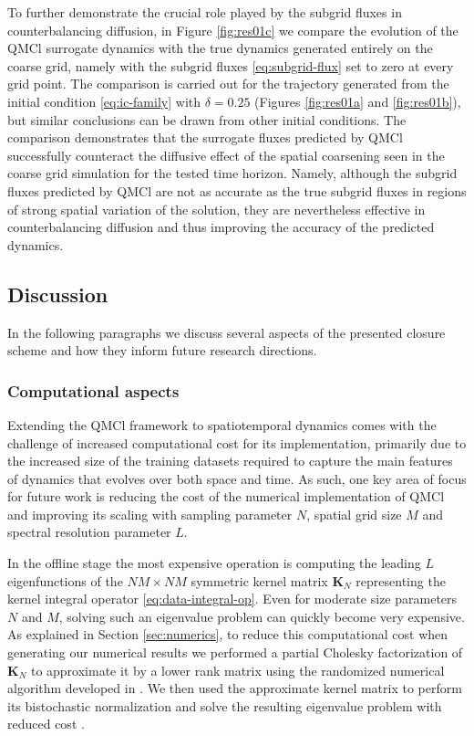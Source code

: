 \documentclass[letterpaper,10pt,3p,preprint]{elsarticle}
\newcommand{\matr}[1]{\bm{#1}}
\begin{document}
To further demonstrate the crucial role played by the subgrid
fluxes in counterbalancing diffusion,
in Figure \ref{fig:res01c}
we compare the evolution of the QMCl surrogate dynamics
with the true dynamics generated entirely on the coarse grid,
namely with the subgrid fluxes
\eqref{eq:subgrid-flux}
set to zero at every grid point.
The comparison is carried out for the trajectory generated from
the initial condition \eqref{eq:ic-family}
with $\delta=0.25$
(Figures \ref{fig:res01a} and \ref{fig:res01b}),
but similar conclusions can be drawn from other initial conditions.
The comparison demonstrates that the surrogate fluxes predicted
by QMCl successfully counteract the diffusive effect of the
spatial coarsening seen in the coarse grid simulation
for the tested time horizon.
Namely, although the subgrid fluxes predicted by QMCl are not as
accurate as the true subgrid fluxes in regions of strong spatial
variation of the solution, they are nevertheless effective
in counterbalancing diffusion and thus improving the accuracy
of the predicted dynamics.


\subsection{Discussion}\label{sec:results-discussion}
In the following paragraphs we discuss several aspects of
the presented closure scheme and how they inform future
research directions.

\subsubsection*{Computational aspects}
Extending the QMCl framework to spatiotemporal dynamics comes with the
challenge of increased computational cost for its implementation,
primarily due to the increased size of the training datasets required
to capture the main features of dynamics that evolves over both space
and time.
As such, one key area of focus for future work is reducing the cost
of the numerical implementation of QMCl and improving its scaling
with sampling parameter $N$, spatial grid size $M$
and spectral resolution parameter $L$.

In the offline stage the most expensive operation is computing the
leading $L$ eigenfunctions of the $NM\times NM$ symmetric kernel
matrix $\matr{K}_N$ representing the kernel integral operator
\eqref{eq:data-integral-op}.
Even for moderate size parameters $N$ and $M$, solving such an
eigenvalue problem can quickly become very expensive.
As explained in Section \ref{sec:numerics}, to reduce this
computational cost when generating our numerical results
we performed a partial Cholesky factorization of
$\matr{K}_N$ to approximate it by a lower rank matrix
using the randomized numerical algorithm developed in
\cite{YChen2024}.
We then used the approximate kernel matrix to perform
its bistochastic normalization and solve the resulting
eigenvalue problem with reduced cost
\cite{Vales2025evd}.
\end{document}
